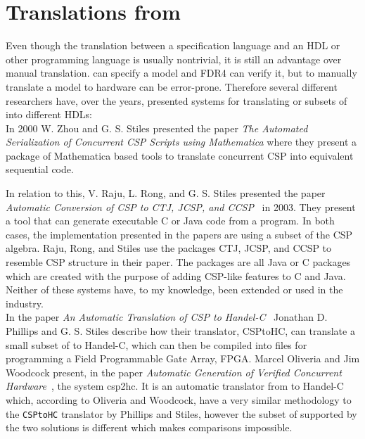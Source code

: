 \section{Translations from \cspm{}}
Even though the translation between a specification language and an HDL or other programming language is usually nontrivial, it is still an advantage over manual translation.
\cspm{} can specify a model and FDR4 can verify it, but to manually translate a model to hardware can be error-prone. Therefore several different researchers have, over the years, presented systems for translating \cspm{} or subsets of \cspm{} into different HDLs:\\

In 2000 W. Zhou and G. S. Stiles presented the paper \textit{The Automated Serialization of Concurrent CSP Scripts using Mathematica}\cite{Zhou2000} where they present a package of Mathematica based tools to translate concurrent CSP into equivalent sequential code.

In relation to this, V. Raju, L. Rong, and G. S. Stiles presented the paper \textit{Automatic Conversion of CSP to CTJ, JCSP, and CCSP}~\cite{Raju2003} in 2003. They present a tool that can generate executable C or Java code from a \cspm{} program. In both cases, the implementation presented in the papers are using a subset of the CSP algebra. Raju,
Rong, and Stiles use the packages CTJ, JCSP, and CCSP to resemble CSP structure in their paper. The packages are all Java or C packages which are created with the purpose of adding CSP-like features to C and Java. Neither of these systems have, to my knowledge, been extended or used in the industry.\\

In the paper \textit{An Automatic Translation of CSP to Handel-C}~\cite{Phillips2004} Jonathan D. Phillips and G. S. Stiles describe how their translator, CSPtoHC, can translate a small subset of \cspm{} to Handel-C\cite{Celoxia2002}, which can then be compiled into files for programming a Field Programmable Gate
Array, FPGA.
Marcel Oliveria and Jim Woodcock present, in the paper \textit{Automatic Generation of Verified Concurrent Hardware}~\cite{Oliveira2007}, the system csp2hc. It is an automatic translator from \cspm{} to Handel-C which, according to Oliveria and Woodcock, have a very similar methodology to the \texttt{CSPtoHC} translator by Phillips and Stiles, however the subset of \cspm{} supported by the two solutions is different which makes comparisons impossible.\\

